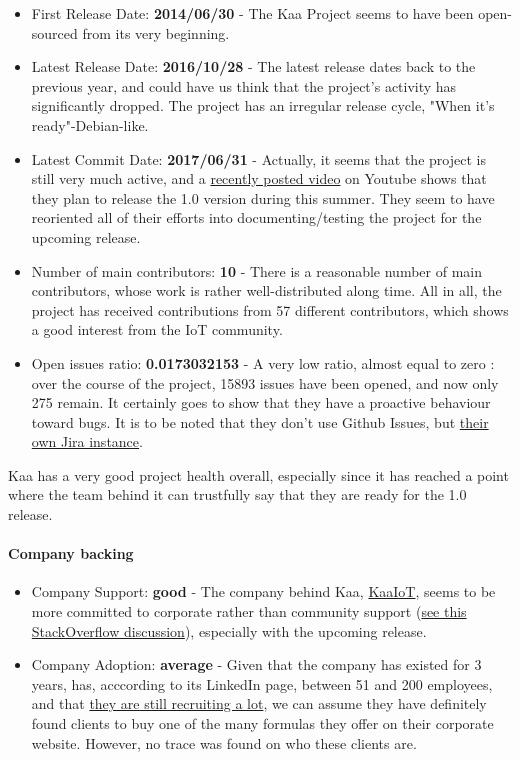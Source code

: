 \documentclass{article}
\begin{document}
\begin{itemize}
\item First Release Date: \textbf{2014/06/30} - The Kaa Project seems to have been open-sourced from its very beginning.
\item Latest Release Date: \textbf{2016/10/28} - The latest release dates back to the previous year, and could have us think that the project's activity has significantly dropped. The project has an irregular release cycle, "When it's ready"-Debian-like.
\item Latest Commit Date: \textbf{2017/06/31} - Actually, it seems that the project is still very much active, and a \href{https://www.youtube.com/watch?v=PaRSwYIGMG4}{recently posted video} on Youtube shows that they plan to release the 1.0 version during this summer. They seem to have reoriented all of their efforts into documenting/testing the project for the upcoming release.
\item Number of main contributors: \textbf{10} - There is a reasonable number of main contributors, whose work is rather well-distributed along time. All in all, the project has received contributions from 57 different contributors, which shows a good interest from the IoT community.
\item Open issues ratio: \textbf{0.0173032153} - A very low ratio, almost equal to zero : over the course of the project, 15893 issues have been opened, and now only 275 remain. It certainly goes to show that they have a proactive behaviour toward bugs. It is to be noted that they don't use Github Issues, but \href{http://jira.kaaproject.org/projects/KAA/issues/}{their own Jira instance}.
\end{itemize}

Kaa has a very good project health overall, especially since it has reached a point where the team behind it can trustfully say that they are ready for the 1.0 release.

\paragraph{Company backing}

\begin{itemize}
\item Company Support: \textbf{good} - The company behind Kaa, \href{https://www.kaaiot.io/}{KaaIoT}, seems to be more committed to corporate rather than community support (\href{https://stackoverflow.com/questions/44330714/why-are-the-questions-about-kaa-basically-not-being-answered}{see this StackOverflow discussion}), especially with the upcoming release.
\item Company Adoption: \textbf{average} - Given that the company has existed for 3 years, has, acccording to its LinkedIn page, between 51 and 200 employees, and that \href{https://www.kaaiot.io/company/careers/}{they are still recruiting a lot}, we can assume they have definitely found clients to buy one of the many formulas they offer on their corporate website. However, no trace was found on who these clients are.
\end{itemize}
\end{document}
